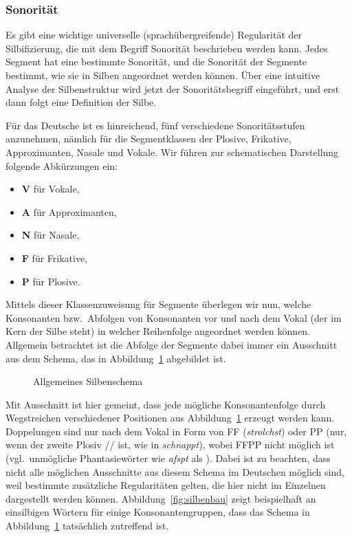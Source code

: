 \subsubsection{Sonorität}

\label{sec:sonoritaet}

Es gibt eine wichtige universelle (sprachübergreifende) Regularität der Silbifizierung, die mit dem Begriff Sonorität beschrieben werden kann.
Jedes Segment hat eine bestimmte Sonorität, und die Sonorität der Segmente bestimmt, wie sie in Silben angeordnet werden können.
Über eine intuitive Analyse der Silbenstruktur wird jetzt der Sonoritätsbegriff eingeführt, und erst dann folgt eine Definition der Silbe.

Für das Deutsche ist es hinreichend, fünf verschiedene Sonoritätsstufen anzunehmen, nämlich für die Segmentklassen der Plosive, Frikative, Approximanten, Nasale und Vokale.
Wir führen zur schematischen Darstellung folgende Abkürzungen ein:

\begin{itemize}\Lf
  \item \textbf{V} für Vokale,
  \item \textbf{A} für Approximanten,
  \item \textbf{N} für Nasale,
  \item \textbf{F} für Frikative,
  \item \textbf{P} für Plosive.
\end{itemize}

Mittels dieser Klassenzuweisung für Segmente überlegen wir nun, welche Konsonanten bzw.\ Abfolgen von Konsonanten vor und nach dem Vokal (der im Kern der Silbe steht) in welcher Reihenfolge angeordnet werden können.
Allgemein betrachtet ist die Abfolge der Segmente dabei immer ein Ausschnitt aus dem Schema, das in Abbildung~\ref{fig:silbenschema} abgebildet ist.

\begin{figure}[!h]
  \centering
  \caption{Allgemeines Silbenschema}
  \label{fig:silbenschema}
\end{figure}

Mit Ausschnitt ist hier gemeint, dass jede mögliche Konsonantenfolge durch Wegstreichen verschiedener Positionen aus Abbildung~\ref{fig:silbenschema} erzeugt werden kann.
Doppelungen sind nur nach dem Vokal in Form von FF (\textit{strolchst}) oder PP (nur, wenn der zweite Plosiv // ist, wie in \textit{schnappt}), wobei FFPP nicht möglich ist (vgl.\ unmögliche Phantasiewörter wie \textit{\Ast afspt} als \textipa{[afspt]}).
Dabei ist zu beachten, dass nicht alle möglichen Ausschnitte aus diesem Schema im Deutschen möglich sind, weil bestimmte zusätzliche Regularitäten gelten, die hier nicht im Einzelnen dargestellt werden können.
Abbildung~\ref{fig:silbenbau} zeigt beispielhaft an einsilbigen Wörtern für einige Konsonantengruppen, dass das Schema in Abbildung~\ref{fig:silbenschema} tatsächlich zutreffend ist.

